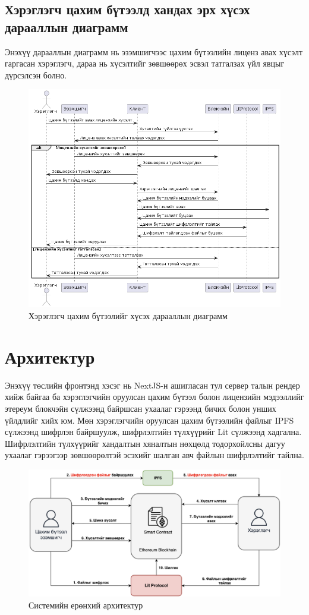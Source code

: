 \pagebreak
\subsection{Хэрэглэгч цахим бүтээлд хандах эрх хүсэх дарааллын диаграмм}
Энэхүү дарааллын диаграмм нь эзэмшигчээс цахим бүтээлийн лиценз авах хүсэлт гаргасан хэрэглэгч, дараа нь хүсэлтийг зөвшөөрөх эсвэл татгалзах үйл явцыг дүрсэлсэн болно.
\begin{figure}[h!]
	\centering
	\includegraphics[scale=0.6,]{src/images/sequence-2.png}
	\caption{Хэрэглэгч цахим бүтээлийг хүсэх дарааллын диаграмм}
\end{figure}

\newpage
\section{Архитектур}
Энэхүү төслийн фронтэнд хэсэг нь NextJS-н ашигласан тул сервер талын рендер хийж байгаа ба хэрэглэгчийн оруулсан цахим бүтээл болон лицензийн мэдээллийг этереум блокчэйн сүлжээнд байршсан ухаалаг гэрээнд бичих болон унших үйлдлийг хийх юм. Мөн хэрэглэгчийн оруулсан цахим бүтээлийн файлыг IPFS сүлжээнд шифрлэн байршуулж, шифрлэлтийн түлхүүрийг Lit сүлжээнд хадгална. Шифрлэлтийн түлхүүрийг хандалтын хяналтын нөхцөлд тодорхойлсны дагуу ухаалаг гэрээгээр зөвшөөрөлтэй эсэхийг шалган авч файлын шифрлэлтийг тайлна.

\begin{figure}[h!]
	\centering
	\includegraphics[scale=0.26]{src/images/architecture.png}
	\caption{Системийн ерөнхий архитектур}
\end{figure}

